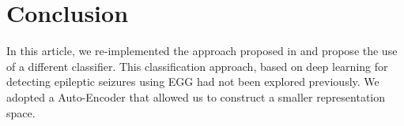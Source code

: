 \newpage

\section{Conclusion}\label{sec:concl}
In this article, we re-implemented the approach proposed in \cite{WenZha:2018} and propose the use of a different classifier. This classification approach, based on deep learning for detecting epileptic seizures using EGG had not been explored previously. We adopted a Auto-Encoder that allowed us to construct a smaller representation space.

